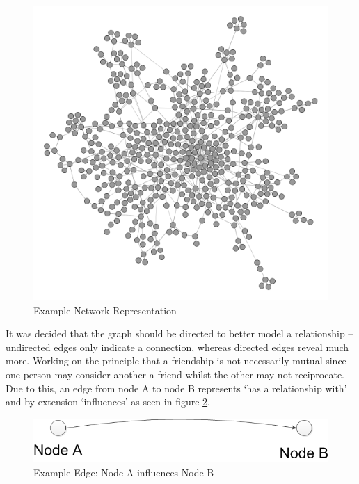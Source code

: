 \documentclass[]{report}
\begin{document}
\begin{figure}
\label{img:ex-graph}
\begin{center}
\includegraphics[scale=0.25]{example-graph.png}
\end{center}
\caption{Example Network Representation}
\end{figure}

It was decided that the graph should be directed to better model a relationship – undirected edges only indicate a connection, whereas directed edges reveal much more. Working on the principle that a friendship is not necessarily mutual since one person may consider another a friend whilst the other may not reciprocate. Due to this, an edge from node A to node B represents `has a relationship with' and by extension `influences' as seen in figure \ref{img:ex-edge}.

\begin{figure}
\label{img:ex-edge}
\begin{center}
\includegraphics[scale=0.5]{example-edge.png}
\end{center}
\caption{Example Edge: Node A influences Node B}
\end{figure}
\end{document}
